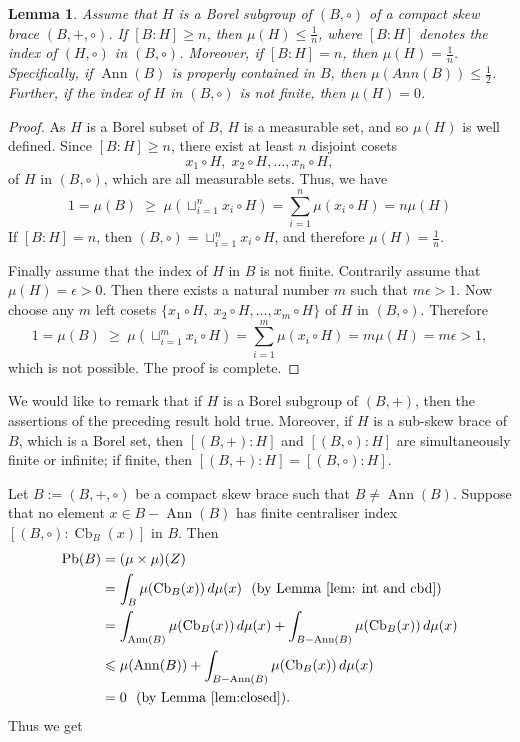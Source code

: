 \documentclass[oneside]{amsart}
\numberwithin{equation}{section}
\theoremstyle{plain}
\newtheorem{lem}[equation]{Lemma}
\theoremstyle{definition}
\newcommand{\Cb}{\operatorname{Cb} }
\newcommand{\Pb}{\operatorname{Pb} }
\newcommand{\Ann}{\operatorname{Ann} }
\begin{document}
\begin{lem}\label{lem:closed}
    Assume that $H$ is a Borel subgroup of $(B,\circ)$  of a compact  skew brace $(B,+, \circ)$. If $[B : H] \geqslant n$, then  $\mu(H) \leqslant \frac{1}{n}$, where $[B : H]$ denotes the index of $(H,\circ)$ in $(B,\circ)$. Moreover, if $[B : H] = n$, then $\mu(H)= \frac{1}{n}$. Specifically, if $\Ann(B)$ is  properly contained in $B$, then  $\mu(Ann(B))\leqslant\frac{1}{2}$. Further, if the index of $H$ in $(B, \circ)$ is not finite, then  $\mu(H)= 0$.
\end{lem}
\begin{proof}
As $H$ is a Borel subset of $B$,  $H$ is a measurable set, and so $\mu(H)$ is well defined.   
Since $[B : H] \geqslant n$, there exist at least $n$ disjoint cosets 
\[
x_{1}   \circ H, \; x_{2} \circ H, \ldots, x_{n}  \circ H, 
\]
of $H$ in $(B, \circ)$, which are all measurable sets.
Thus, we have
\[
1 = \mu(B) \;\geqslant\; \mu\!\left(\sqcup_{i=1}^{n} x_{i} \circ H \right) 
= \sum_{i=1}^{n} \mu(x_{i}   \circ H) 
= n \mu(H)
\]
If $[B : H] = n$, then $(B, \circ) = \sqcup_{i=1}^{n} x_{i}   \circ H$, and therefore $\mu(H)= \frac{1}{n}$.

Finally assume that the index of $H$ in $B$ is not finite. Contrarily assume that  $\mu(H)  = \epsilon > 0$.  Then there exists a natural number $m$ such that $m \epsilon > 1$. Now choose any $m$ left cosets $\{x_{1} \circ H, \; x_{2} \circ H, \ldots, x_{m} \circ H\}$ of $H$ in $(B, \circ)$. Therefore
\[
1 = \mu(B) \;\geqslant\; \mu\!\left(\sqcup_{i=1}^{m} x_{i} \circ H \right) 
= \sum_{i=1}^{m} \mu(x_{i} \circ H) 
= m \mu(H) = m \epsilon > 1,
\]
which is not possible. The proof is complete. 
\end{proof}

We would like to remark that if $H$ is a Borel subgroup of $(B, +)$, then the assertions of the preceding result hold true. Moreover, if $H$ is a sub-skew brace of $B$, which is a Borel set, then $[(B, +) : H]$ and $[(B, \circ) : H]$ are simultaneously finite or infinite; if finite, then $[(B, +) : H] = [(B, \circ) : H]$.



Let $B:= (B, +, \circ)$ be a compact  skew brace such that $B \ne \Ann(B)$. Suppose that no element $x \in B - \Ann(B)$ has finite centraliser index $[(B, \circ): \Cb_B(x)]$ in $B$. Then 
\begin{align*}
    \Pb(B) &= (\mu \times \mu)(Z)\\
           &= \int_{B} \mu(\Cb_{B}(x)) \, d\mu(x)~~(\text{by Lemma }\ref{lem: int and cbd})\\
           &= \int_{\Ann(B)} \mu(\Cb_{B}(x)) \, d\mu(x) + \int_{B - \Ann(B)} \mu(\Cb_{B}(x)) \, d\mu(x)\\
           & \leqslant \mu(\Ann(B)) +  \int_{B - \Ann(B)} \mu(\Cb_{B}(x)) \, d\mu(x)\\
           & = 0 ~~(\text{by Lemma }\ref{lem:closed}).
 \end{align*}
 Thus we get
\end{document}
